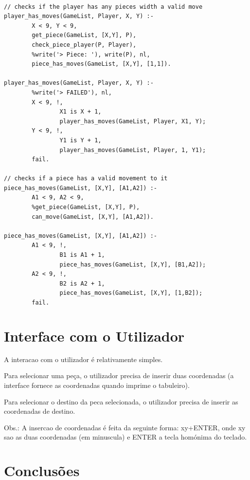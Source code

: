 \begin{lstlisting}

// checks if the player has any pieces width a valid move
player_has_moves(GameList, Player, X, Y) :-
        X < 9, Y < 9,
        get_piece(GameList, [X,Y], P),
        check_piece_player(P, Player),
        %write('> Piece: '), write(P), nl,
        piece_has_moves(GameList, [X,Y], [1,1]).

player_has_moves(GameList, Player, X, Y) :-
        %write('> FAILED'), nl,
        X < 9, !,
                X1 is X + 1,
                player_has_moves(GameList, Player, X1, Y);
        Y < 9, !,
                Y1 is Y + 1,
                player_has_moves(GameList, Player, 1, Y1);
        fail.

// checks if a piece has a valid movement to it
piece_has_moves(GameList, [X,Y], [A1,A2]) :-
        A1 < 9, A2 < 9,
        %get_piece(GameList, [X,Y], P),
        can_move(GameList, [X,Y], [A1,A2]).

piece_has_moves(GameList, [X,Y], [A1,A2]) :-
        A1 < 9, !,
                B1 is A1 + 1,
                piece_has_moves(GameList, [X,Y], [B1,A2]);
        A2 < 9, !,
                B2 is A2 + 1,
                piece_has_moves(GameList, [X,Y], [1,B2]);
        fail.

\end{lstlisting}

\newpage

\section{Interface com o Utilizador}

A interacao com o utilizador é relativamente simples.

Para selecionar uma peça, o utilizador precisa de inserir duas coordenadas
(a interface fornece as coordenadas quando imprime o tabuleiro).

Para selecionar o destino da peca selecionada, o utilizador precisa de inserir as coordenadas de destino.

Obs.: A insercao de coordenadas é feita da seguinte forma: xy+ENTER, onde xy sao as duas coordenadas (em minuscula)
e ENTER a tecla homónima do teclado.

\vspace{1cm}

\section{Conclusões}

